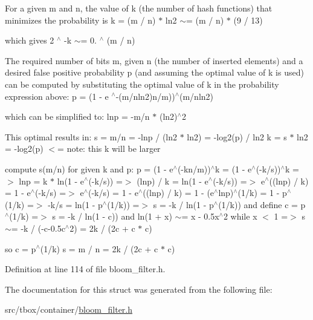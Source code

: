 For a given m and n, the value of k (the number of hash functions) that minimizes the probability is k = (m / n) $\ast$ ln2 $\sim$= (m / n) $\ast$ (9 / 13)

which gives 2 $^\wedge$ -\/k $\sim$= 0. $^\wedge$ (m / n)

The required number of bits m, given n (the number of inserted elements) and a desired false positive probability p (and assuming the optimal value of k is used) can be computed by substituting the optimal value of k in the probability expression above\-: p = (1 -\/ e $^\wedge$-\/(m/nln2)n/m))$^\wedge$(m/nln2)

which can be simplified to\-: lnp = -\/m/n $\ast$ (ln2)$^\wedge$2

This optimal results in\-: s = m/n = -\/lnp / (ln2 $\ast$ ln2) = -\/log2(p) / ln2 k = s $\ast$ ln2 = -\/log2(p) $<$= note\-: this k will be larger

compute s(m/n) for given k and p\-: p = (1 -\/ e$^\wedge$(-\/kn/m))$^\wedge$k = (1 -\/ e$^\wedge$(-\/k/s))$^\wedge$k =$>$ lnp = k $\ast$ ln(1 -\/ e$^\wedge$(-\/k/s)) =$>$ (lnp) / k = ln(1 -\/ e$^\wedge$(-\/k/s)) =$>$ e$^\wedge$((lnp) / k) = 1 -\/ e$^\wedge$(-\/k/s) =$>$ e$^\wedge$(-\/k/s) = 1 -\/ e$^\wedge$((lnp) / k) = 1 -\/ (e$^\wedge$lnp)$^\wedge$(1/k) = 1 -\/ p$^\wedge$(1/k) =$>$ -\/k/s = ln(1 -\/ p$^\wedge$(1/k)) =$>$ s = -\/k / ln(1 -\/ p$^\wedge$(1/k)) and define c = p$^\wedge$(1/k) =$>$ s = -\/k / ln(1 -\/ c)) and ln(1 + x) $\sim$= x -\/ 0.\-5x$^\wedge$2 while x $<$ 1 =$>$ s $\sim$= -\/k / (-\/c-\/0.\-5c$^\wedge$2) = 2k / (2c + c $\ast$ c)

so c = p$^\wedge$(1/k) s = m / n = 2k / (2c + c $\ast$ c) 

Definition at line 114 of file bloom\-\_\-filter.\-h.



The documentation for this struct was generated from the following file\-:\begin{DoxyCompactItemize}
\item 
src/tbox/container/\hyperlink{bloom__filter_8h}{bloom\-\_\-filter.\-h}\end{DoxyCompactItemize}
